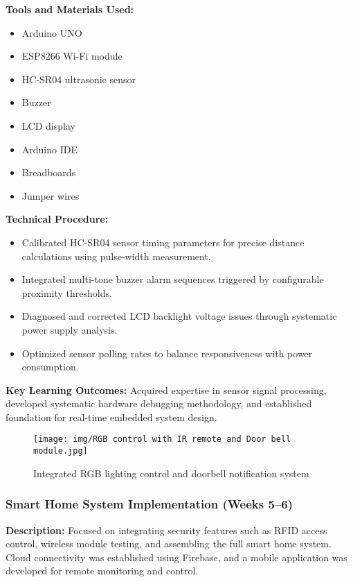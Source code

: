 \documentclass[12pt,a4paper]{report}
\begin{document}
\textbf{Tools and Materials Used:}
\begin{multicols}{2}
\begin{itemize}
    \item Arduino UNO
    \item ESP8266 Wi-Fi module
    \item HC-SR04 ultrasonic sensor
    \item Buzzer
    \item LCD display
    \item Arduino IDE
    \item Breadboards
    \item Jumper wires
\end{itemize}
\end{multicols}

\textbf{Technical Procedure:}
\noindent
\begin{itemize}
    \item Calibrated HC-SR04 sensor timing parameters for precise distance calculations using pulse-width measurement.
    \item Integrated multi-tone buzzer alarm sequences triggered by configurable proximity thresholds.
    \item Diagnosed and corrected LCD backlight voltage issues through systematic power supply analysis.
    \item Optimized sensor polling rates to balance responsiveness with power consumption.
\end{itemize}

\noindent\textbf{Key Learning Outcomes:} Acquired expertise in sensor signal processing, developed systematic hardware debugging methodology, and established foundation for real-time embedded system design.

\begin{figure}[H]
\centering
\texttt{[image: img/RGB control with IR remote and Door bell module.jpg]}
\caption{Integrated RGB lighting control and doorbell notification system}
\label{fig:rgb-doorbell}
\end{figure}

\subsubsection{Smart Home System Implementation (Weeks 5--6)}

\textbf{Description:} Focused on integrating security features such as RFID access control, wireless module testing, and assembling the full smart home system. Cloud connectivity was established using Firebase, and a mobile application was developed for remote monitoring and control.
\end{document}
